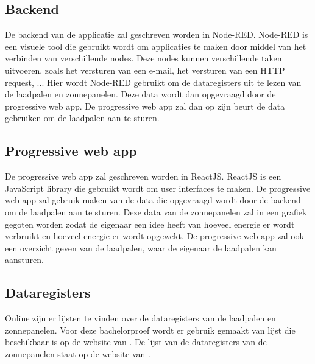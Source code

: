 \subsection{Backend}%
\label{sub:backend}
De backend van de applicatie zal geschreven worden in Node-RED. Node-RED is een visuele tool die gebruikt wordt om applicaties te maken door middel van het verbinden van verschillende nodes. Deze nodes kunnen verschillende taken uitvoeren, zoals het versturen van een e-mail, het versturen van een HTTP request, ... Hier wordt Node-RED gebruikt om de dataregisters uit te lezen van de laadpalen en zonnepanelen. Deze data wordt dan opgevraagd door de progressive web app. De progressive web app zal dan op zijn beurt de data gebruiken om de laadpalen aan te sturen.

\subsection{Progressive web app}%
\label{sub:progressive_web_app}
De progressive web app zal geschreven worden in ReactJS. ReactJS is een JavaScript library die gebruikt wordt om user interfaces te maken. De progressive web app zal gebruik maken van de data die opgevraagd wordt door de backend om de laadpalen aan te sturen. Deze data van de zonnepanelen zal in een grafiek gegoten worden zodat de eigenaar een idee heeft van hoeveel energie er wordt verbruikt en hoeveel energie er wordt opgewekt. De progressive web app zal ook een overzicht geven van de laadpalen, waar de eigenaar de laadpalen kan aansturen.

\subsection{Dataregisters}%
\label{sub:dataregisters}
Online zijn er lijsten te vinden over de dataregisters van de laadpalen en zonnepanelen. Voor deze bachelorproef wordt er gebruik gemaakt van lijst die beschikbaar is op de website van \textcite{Alfen2020}. De lijst van de dataregisters van de zonnepanelen staat op de website van \textcite{solarinverters2016}.


